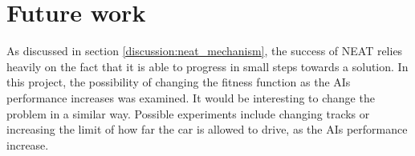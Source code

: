 





\chapter{Future work}
As discussed in section \ref{discussion:neat_mechanism}, the success of NEAT relies heavily on the fact that it is able to progress in small steps towards a solution. In this project, the possibility of changing the fitness function as the AIs performance increases was examined. It would be interesting to change the problem in a similar way. Possible experiments include changing tracks or increasing the limit of how far the car is allowed to drive, as the AIs performance increase.

